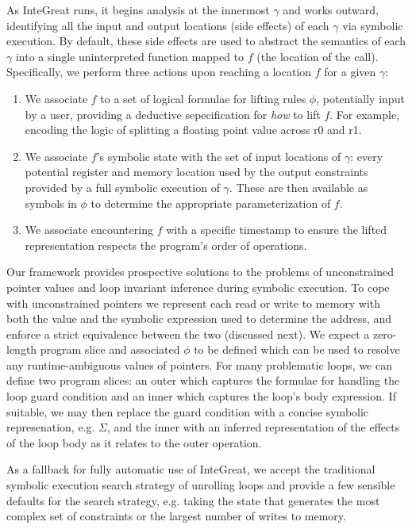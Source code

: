 As InteGreat runs, it begins analysis at the innermost $\gamma$ and works outward, identifying all the input and output locations (side effects) of each $\gamma$ via symbolic execution.
By default, these side effects are used to abstract the semantics of each $\gamma$ into a single uninterpreted function mapped to $f$ (the location of the call).
Specifically, we perform three actions upon reaching a location $f$ for a given $\gamma$:
\begin{enumerate}
	\item We associate $f$ to a set of logical formulae for lifting rules
	$\phi$, potentially input by a user, providing a deductive
	sepecification for \emph{how} to lift $f$. For example, encoding the
	logic of splitting a floating point value across r0 and r1.
	\item We associate $f$'s symbolic state with the set of input locations
	of $\gamma$: every potential register and memory location used by the
	output constraints provided by a full symbolic execution of $\gamma$.
	These are then available as symbols in $\phi$ to determine the
	appropriate parameterization of $f$.
	\item We associate encountering $f$ with a specific timestamp to ensure
	the lifted representation respects the program's order of operations.
\end{enumerate}

Our framework provides prospective solutions to the problems of unconstrained pointer values and loop invariant inference during symbolic execution.
To cope with unconstrained pointers we represent each read or write to memory with both the value and the symbolic expression used to determine the address, and enforce a strict equivalence between the two (discussed next).
We expect a zero-length program slice and associated $\phi$ to be defined which can be used to resolve any runtime-ambiguous values of pointers.
For many problematic loops, we can define two program slices: an outer which captures the formulae for handling the loop guard condition and an inner which captures the loop's body expression.
If suitable, we may then replace the guard condition with a concise symbolic represenation, e.g. $\Sigma$, and the inner with an inferred representation of the effects of the loop body as it relates to the outer operation.

As a fallback for fully automatic use of InteGreat, we accept the traditional symbolic execution search strategy of unrolling loops and provide a few sensible defaults for the search strategy, e.g. taking the state that generates the most complex set of constraints or the largest number of writes to memory.

